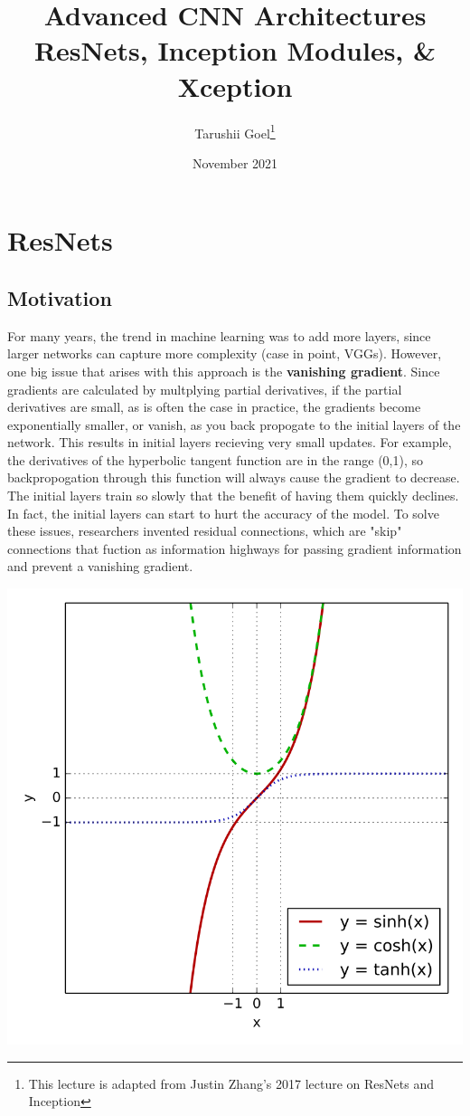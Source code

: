 \documentclass{article}
\title{Advanced CNN Architectures \\ ResNets, Inception Modules, \& Xception}
\author{Tarushii Goel\footnote{This lecture is adapted from Justin Zhang's 2017 lecture on ResNets and Inception}}
\date{November 2021}
\begin{document}
\maketitle

\section{ResNets}
\subsection{Motivation}
For many years, the trend in machine learning was to add more layers, since larger networks can capture more complexity (case in point, VGGs). However, one big issue that arises with this approach is the {\bf vanishing gradient}. Since gradients are calculated by multplying partial derivatives, if the partial derivatives are small, as is often the case in practice, the gradients become exponentially smaller, or vanish, as you back propogate to the initial layers of the network. This results in initial layers recieving very small updates. For example, the derivatives of the hyperbolic tangent function are in the range (0,1), so backpropogation through this function will always cause the gradient to decrease. The initial layers train so slowly that the benefit of having them quickly declines. In fact, the initial layers can start to hurt the accuracy of the model. To solve these issues, researchers invented residual connections, which are "skip" connections that fuction as information highways for passing gradient information and prevent a vanishing gradient. 
\begin{center}
\includegraphics[scale=0.2]{tanh.png}
\end{center}
\end{document}
